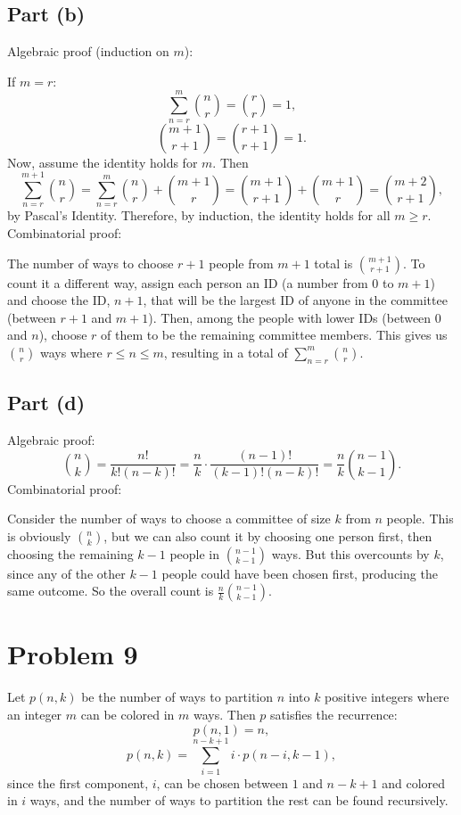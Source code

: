 \documentclass{article}
\begin{document}
\subsection*{Part (b)}
Algebraic proof (induction on $m$):

If $m = r$:
$$\sum_{n = r}^m \binom{n}{r} = \binom{r}{r} = 1,$$
$$\binom{m + 1}{r + 1} = \binom{r + 1}{r + 1} = 1.$$
Now, assume the identity holds for $m$. Then
$$\sum_{n = r}^{m + 1} \binom{n}{r} = \sum_{n = r}^{m} \binom{n}{r} + \binom{m + 1}{r} = \binom{m + 1}{r + 1} + \binom{m + 1}{r} = \binom{m + 2}{r + 1},$$
by Pascal's Identity. Therefore, by induction, the identity holds for all $m \ge r$. \\

Combinatorial proof:

The number of ways to choose $r + 1$ people from $m + 1$ total is $\binom{m + 1}{r + 1}$. To count it a different way, assign each person an ID (a number from $0$ to $m + 1$) and choose the ID, $n + 1$, that will be the largest ID of anyone in the committee (between $r + 1$ and $m + 1$). Then, among the people with lower IDs (between $0$ and $n$), choose $r$ of them to be the remaining committee members. This gives us $\binom{n}{r}$ ways where $r \le n \le m$, resulting in a total of $\sum_{n = r}^m \binom{n}{r}$.

\subsection*{Part (d)}
Algebraic proof:
$$\binom{n}{k} = \frac{n!}{k!(n - k)!} = \frac{n}{k}\cdot \frac{(n - 1)!}{(k - 1)!(n - k)!} = \frac{n}{k}\binom{n - 1}{k - 1}.$$
Combinatorial proof:

Consider the number of ways to choose a committee of size $k$ from $n$ people. This is obviously $\binom{n}{k}$, but we can also count it by choosing one person first, then choosing the remaining $k - 1$ people in $\binom{n - 1}{k - 1}$ ways. But this overcounts by $k$, since any of the other $k - 1$ people could have been chosen first, producing the same outcome. So the overall count is $\frac{n}{k}\binom{n - 1}{k - 1}$.

\section*{Problem 9}
Let $p(n, k)$ be the number of ways to partition $n$ into $k$ positive integers where an integer $m$ can be colored in $m$ ways. Then $p$ satisfies the recurrence:
$$p(n, 1) = n,$$
$$p(n, k) = \sum_{i = 1}^{n - k + 1} i \cdot p(n - i, k - 1),$$
since the first component, $i$, can be chosen between $1$ and $n - k + 1$ and colored in $i$ ways, and the number of ways to partition the rest can be found recursively. \\
\end{document}
